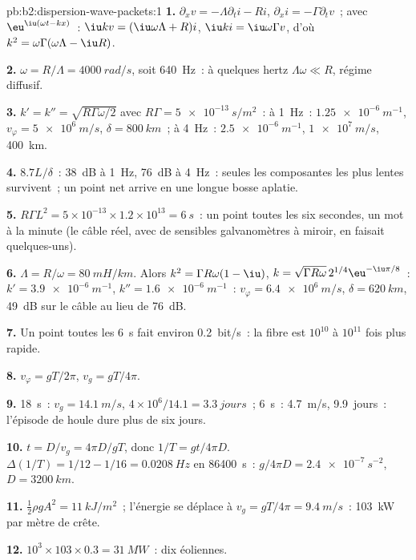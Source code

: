 \begin{solution}{pb:b2:dispersion-wave-packets:1}
\textbf{1.} $\partial_xv = -\Lambda\partial_ti - Ri$, $\partial_xi = -\Gamma\partial_tv$~; avec
$\eu^{\iu(\omega t - kx)}$~: $\iu kv = (\iu\omega\Lambda + R)i$, $\iu ki = \iu\omega\Gamma v$, d'où
$k^2 = \omega\Gamma(\omega\Lambda - \iu R)$.

\textbf{2.} $\omega = R/\Lambda = \qty{4000}{rad/s}$, soit \qty{640}{Hz}~: à quelques hertz $\Lambda\omega
\ll R$, régime diffusif.

\textbf{3.} $k' = k'' = \sqrt{R\Gamma\omega/2}$ avec $R\Gamma = \qty{5e-13}{s/m^2}$~: à \qty{1}{Hz}~:
$\qty{1.25e-6}{m^{-1}}$, $v_\varphi = \qty{5e6}{m/s}$, $\delta = \qty{800}{km}$~; à \qty{4}{Hz}~:
$\qty{2.5e-6}{m^{-1}}$, $\qty{1e7}{m/s}$, \qty{400}{km}.

\textbf{4.} $8.7L/\delta$~: \qty{38}{dB} à \qty{1}{Hz}, \qty{76}{dB} à \qty{4}{Hz}~: seules les
composantes les plus lentes survivent~; un point net arrive en une longue bosse aplatie.

\textbf{5.} $R\Gamma L^2 = 5 \times 10^{-13} \times 1.2 \times 10^{13} = \qty{6}{s}$~: un point toutes les
six secondes, un mot à la minute (le câble réel, avec de sensibles galvanomètres à
miroir, en faisait quelques-uns).

\textbf{6.} $\Lambda = R/\omega = \qty{80}{mH/km}$. Alors $k^2 = \Gamma R\omega(1 - \iu)$, $k = \sqrt{\Gamma R\omega}
\,2^{1/4}\eu^{-\iu\pi/8}$~: $k' = \qty{3.9e-6}{m^{-1}}$, $k'' = \qty{1.6e-6}{m^{-1}}$~: $v_\varphi =
\qty{6.4e6}{m/s}$, $\delta = \qty{620}{km}$, \qty{49}{dB} sur le câble au lieu de
\qty{76}{dB}.

\textbf{7.} Un point toutes les \qty{6}{s} fait environ \qty{0.2}{bit/s}~: la fibre est
$10^{10}$ à $10^{11}$ fois plus rapide.

\textbf{8.} $v_\varphi = gT/2\pi$, $v_g = gT/4\pi$.

\textbf{9.} \qty{18}{s}~: $v_g = \qty{14.1}{m/s}$, $4 \times 10^6/14.1 = \qty{3.3}{jours}$~;
\qty{6}{s}~: \qty{4.7}{m/s}, \qty{9.9}{jours}~: l'épisode de houle dure plus de six jours.

\textbf{10.} $t = D/v_g = 4\pi D/gT$, donc $1/T = gt/4\pi D$. $\Delta(1/T) = 1/12 - 1/16
= \qty{0.0208}{Hz}$ en \qty{86400}{s}~: $g/4\pi D = \qty{2.4e-7}{s^{-2}}$, $D = \qty{3200}{km}$.

\textbf{11.} $\tfrac12\rho gA^2 = \qty{11}{kJ/m^2}$~; l'énergie se déplace à $v_g = gT/4\pi =
\qty{9.4}{m/s}$~: \qty{103}{kW} par mètre de crête.

\textbf{12.} $10^3 \times 103 \times 0.3 = \qty{31}{MW}$~: dix éoliennes.


\end{solution}
